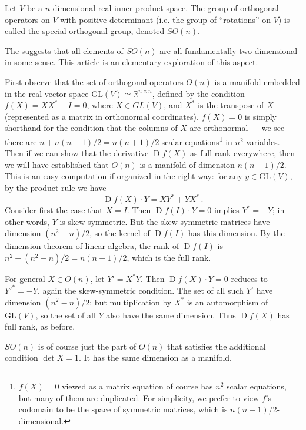 \documentclass[12pt]{article}
\newcommand{\real}{\mathbb{R}}
\newcommand{\GLV}{\mathrm{GL}(V)}
\DeclareMathOperator{\D}{D}
\begin{document}
Let $V$ be a $n$-dimensional real inner product space.
The group of orthogonal operators on $V$ with positive determinant
(i.e. the group of ``rotations'' on $V$)
is called the special orthogonal group, denoted $SO(n)$.

The 
suggests that all elements of $SO(n)$ are all fundamentally two-dimensional in some sense.
This article is an elementary exploration of this aspect.

\bigskip

First observe that the set of orthogonal operators $O(n)$ is a manifold embedded
in the real vector space $\GLV \simeq \real^{n \times n}$,
defined by
the condition $f(X)  = X X^* - I = 0$, where $X \in GL(V)$, and $X^*$ is the 
transpose of $X$ (represented as a matrix in orthonormal coordinates).
$f(X) = 0$ is simply shorthand for the condition that the columns of $X$ are 
orthonormal --- we see there are $n + n(n-1)/2 = n(n+1)/2$ scalar equations\footnote{$f(X)=0$ viewed as a matrix equation of course has $n^2$ scalar equations,
but many of them are duplicated. For simplicity,
we prefer to view $f$'s codomain to be the space of symmetric matrices, which is $n(n+1)/2$-dimensional.} in $n^2$ variables.  Then if we can show that the derivative $\D f(X)$ as full rank everywhere,
then we will have established that $O(n)$ is a manifold of dimension $n(n-1)/2$.
This is an easy computation if organized in the right way:
for any $y \in \GLV$, by the product rule we have
\[
\D f(X) \cdot Y = X Y^* + Y X^*\,.
\]
Consider first the case that $X = I$.  Then $\D f(I) \cdot Y = 0$ implies $Y^* = - Y$;
in other words, $Y$ is skew-symmetric.  But the skew-symmetric matrices have dimension 
$(n^2 - n)/2$, so the kernel of $\D f(I)$ has this dimension.
By the dimension theorem of linear algebra, the rank of $\D f(I)$ is $n^2 - (n^2 - n)/2 = n(n+1)/2$,
which is the full rank.

For general $X \in O(n)$, let $Y' = X^* Y$.  Then $\D f(X) \cdot Y = 0$ reduces to $Y'^* = -Y$,
again the skew-symmetric condition. 
The set of all such $Y'$ have dimension $(n^2 -n)/2$; but multiplication by $X^*$
is an automorphism of $\GLV$, so the set of all $Y$ also have the same dimension.
Thus $\D f(X)$ has full rank, as before.

$SO(n)$ is of course just the part of $O(n)$ that satisfies the additional condition
$\det X = 1$. It has the same dimension as a manifold.
\end{document}
